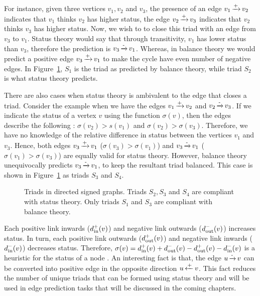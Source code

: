 For instance, given three vertices $v_1,v_2$ and $v_3$, the presence of an edge $v_1 \operatorname*{\xrightarrow{+}} v_2$ indicates that $v_1$ thinks $v_2$ has higher status, the edge $v_2 \operatorname*{\xrightarrow{+}} v_3$ indicates that $v_2$ thinks $v_3$ has higher status.
Now, we wish to to close this triad with an edge from $v_3$ to $v_1$.
Status theory would say that through transitivity, $v_1$ has lower status than $v_3$, therefore the prediction is $v_3 \operatorname*{\xrightarrow{-}} v_1$.
Whereas, in balance theory we would predict a positive edge $v_3 \operatorname*{\xrightarrow{+}} v_1$ to make the cycle have even number of negative edges.
In Figure~\ref{fig:status-triads}, $S_1$ is the triad as predicted by balance theory, while triad $S_2$ is what status theory predicts.

There are also cases when status theory is ambivalent to the edge that closes a triad.
Consider the example when we have the edges $v_1 \operatorname*{\xrightarrow{+}} v_2$ and $v_2 \operatorname*{\xrightarrow{-}} v_3$.
If we indicate the status of a vertex $v$ using the function $\sigma(v)$, then the edges describe the following : $\sigma(v_2)>s(v_1) $ and $\sigma(v_2)>\sigma(v_3)$.
Therefore, we have no knowledge of the relative difference in status between the vertices $v_1$ and $v_3$.
Hence, both edges $v_3 \operatorname*{\xrightarrow{+}} v_1$ ($\sigma(v_3) > \sigma(v_1)$) and $v_3 \operatorname*{\xrightarrow{-}} v_1$ ($\sigma(v_1) > \sigma(v_3)$) are equally valid for status theory.
However, balance theory unequivocally predicts $v_3 \operatorname*{\xrightarrow{-}} v_1$, to keep the resultant triad balanced.
This case is shown in Figure~\ref{fig:status-triads} as triads $S_3$ and $S_4$.

\begin{figure}[!ht] 
    \centering
    
    \caption{Triads in directed signed graphs. Triads $S_2,S_3$ and $S_4$ are compliant with status theory. Only triads $S_1$ and $S_3$ are compliant with balance theory.}
    \label{fig:status-triads}
\end{figure}

Each positive link inwards ($d_{\text{in}}^{+}(v)$) and negative link outwards ($d_{\text{out}}^{-}(v)$) increases status.
In turn, each positive link outwards ($d_{\text{out}}^{+}(v)$) and negative link inwards ($d_{\text{in}}^{-}(v)$) decreases status.
Therefore, $\sigma(v) = d_{\text{in}}^{+}(v) + d_{\text{out}}^{-}(v) - d_{\text{out}}^{+}(v)- d_{\text{in}}^{-}(v)$ is a heuristic for the status of a node \cite{leskovec2010predicting}.
An interesting fact is that, the edge $u \operatorname*{\xrightarrow{-}} v$ can be converted into positive edge in the opposite direction $u \operatorname*{\xleftarrow{+}} v$.
This fact reduces the number of unique triads that can be formed using status theory and will be used in edge prediction tasks that will be discussed in the coming chapters.

